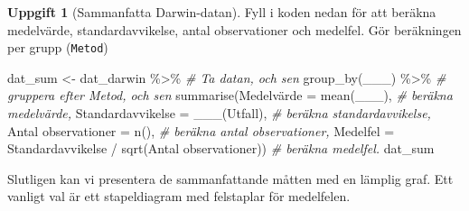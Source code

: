 \documentclass[
]{book}
\newenvironment{Shaded}{\begin{snugshade}}{\end{snugshade}}
\newcommand{\AttributeTok}[1]{\textcolor[rgb]{0.77,0.63,0.00}{#1}}
\newcommand{\CommentTok}[1]{\textcolor[rgb]{0.56,0.35,0.01}{\textit{#1}}}
\newcommand{\FunctionTok}[1]{\textcolor[rgb]{0.00,0.00,0.00}{#1}}
\newcommand{\NormalTok}[1]{#1}
\newcommand{\OtherTok}[1]{\textcolor[rgb]{0.56,0.35,0.01}{#1}}
\newcommand{\SpecialCharTok}[1]{\textcolor[rgb]{0.00,0.00,0.00}{#1}}
\newcommand{\StringTok}[1]{\textcolor[rgb]{0.31,0.60,0.02}{#1}}
\theoremstyle{definition}
\theoremstyle{definition}
\theoremstyle{definition}
\newtheorem{exercise}{Uppgift}[chapter]
\theoremstyle{definition}
\theoremstyle{remark}
\begin{document}
\begin{exercise}[Sammanfatta Darwin-datan]

Fyll i koden nedan för att beräkna medelvärde, standardavvikelse, antal observationer och medelfel. Gör beräkningen per grupp (\texttt{Metod})

\begin{Shaded}
\begin{Highlighting}[]
\NormalTok{dat\_sum }\OtherTok{\textless{}{-}}\NormalTok{ dat\_darwin }\SpecialCharTok{\%\textgreater{}\%}                                                 \CommentTok{\# Ta datan, och sen}
  \FunctionTok{group\_by}\NormalTok{(\_\_\_) }\SpecialCharTok{\%\textgreater{}\%}                                                       \CommentTok{\# gruppera efter Metod, och sen}
  \FunctionTok{summarise}\NormalTok{(Medelvärde }\OtherTok{=} \FunctionTok{mean}\NormalTok{(\_\_\_),                                       }\CommentTok{\# beräkna medelvärde,}
            \AttributeTok{Standardavvikelse =} \FunctionTok{\_\_\_}\NormalTok{(Utfall),                              }\CommentTok{\# beräkna standardavvikelse,}
            \StringTok{\textasciigrave{}}\AttributeTok{Antal observationer}\StringTok{\textasciigrave{}} \OtherTok{=} \FunctionTok{n}\NormalTok{(),                                  }\CommentTok{\# beräkna antal observationer,}
            \AttributeTok{Medelfel =}\NormalTok{ Standardavvikelse }\SpecialCharTok{/} \FunctionTok{sqrt}\NormalTok{(}\StringTok{\textasciigrave{}}\AttributeTok{Antal observationer}\StringTok{\textasciigrave{}}\NormalTok{))   }\CommentTok{\# beräkna medelfel.}
\NormalTok{dat\_sum}
\end{Highlighting}
\end{Shaded}

\end{exercise}

Slutligen kan vi presentera de sammanfattande måtten med en lämplig graf. Ett vanligt val är ett stapeldiagram med felstaplar för medelfelen.
\end{document}
